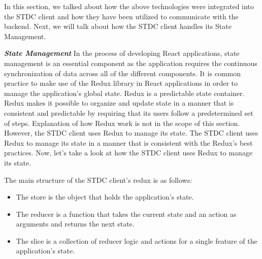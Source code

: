 \begin{justify}
        \vspace{0.25cm}
        \newendline In this section, we talked about how the above technologies were integrated into the STDC client and
        how they have been utilized to communicate with the backend. Next, we will talk about how the STDC client handles its State Management.

        \clearpage






    \vspace{0.25cm}
    \newendline \textbf{\textit{State Management}}\newendline
        In the process of developing React applications, state management is an essential component as the application requires the continuous synchronization of data across all of the different components. It is common practice to make use of the Redux library in React applications in order to manage the application's global state. Redux is a predictable state container. Redux makes it possible to organize and update state in a manner that is consistent and predictable by requiring that its users follow a predetermined set of steps. Explanation of how Redux work is not in the scope of this section. However, the STDC client uses Redux to manage its state. The STDC client uses Redux to manage its state in a manner that is consistent with the Redux's best practices. Now, let's take a look at how the STDC client uses Redux to manage its state.

        \vspace{0.25cm}
        \newendline The main structure of the STDC client's redux is as follows:

        \begin{itemize}
            \item The store is the object that holds the application's state.
            \item The reducer is a function that takes the current state and an action as arguments and returns the next state.
            \item The slice is a collection of reducer logic and actions for a single feature of the application's state.
        \end{itemize}


\end{justify}

